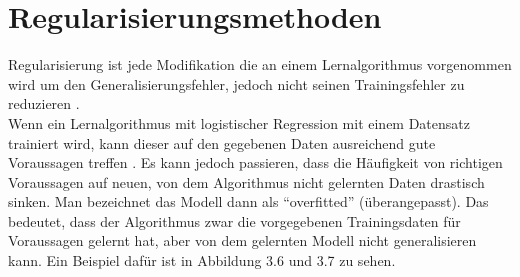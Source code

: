 \section{Regularisierungsmethoden}
Regularisierung ist jede Modifikation die an einem Lernalgorithmus vorgenommen wird um den Generalisierungsfehler, jedoch nicht seinen Trainingsfehler zu reduzieren \cite{GOO}.\\
Wenn ein Lernalgorithmus mit logistischer Regression mit einem Datensatz trainiert wird, kann dieser auf den gegebenen Daten ausreichend gute Voraussagen treffen \cite{NG}. Es kann jedoch passieren, dass die Häufigkeit von richtigen Voraussagen auf neuen, von dem Algorithmus nicht gelernten Daten drastisch sinken. Man bezeichnet das Modell dann als "`overfitted"' (überangepasst). Das bedeutet, dass der Algorithmus zwar die vorgegebenen Trainingsdaten für Voraussagen gelernt hat, aber von dem gelernten Modell nicht generalisieren kann. Ein Beispiel dafür ist in Abbildung 3.6 und 3.7 zu sehen.
